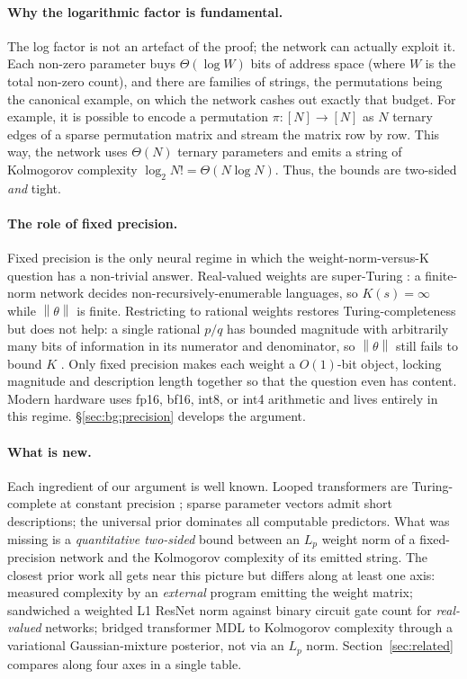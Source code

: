 \documentclass{article}
\theoremstyle{definition}
\newcommand{\norm}[1]{\left\lVert#1\right\rVert}
\begin{document}
\paragraph{Why the logarithmic factor is fundamental.} The log factor is not an artefact of the proof; the network can actually
exploit it. Each non-zero parameter buys $\Theta(\log W)$ bits of address space
(where $W$ is the total non-zero count), and there are families of strings, the
permutations being the canonical example, on which the network cashes out
exactly that budget. For example, it is possible to encode a permutation $\pi :
  [N] \to [N]$ as $N$ ternary edges of a sparse permutation matrix and stream the
matrix row by row. This way, the network uses $\Theta(N)$ ternary parameters
and emits a string of Kolmogorov complexity $\log_2 N! = \Theta(N \log N)$.
Thus, the bounds are two-sided \emph{and} tight.

\paragraph{The role of fixed precision.} Fixed precision is the only neural regime in which the weight-norm-versus-K
question has a non-trivial answer. Real-valued weights are super-Turing
\citep{siegelmann1995computational}: a finite-norm network decides
non-recursively-enumerable languages, so $K(s) = \infty$ while $\norm{\theta}$
is finite. Restricting to rational weights restores Turing-completeness but
does not help: a single rational $p/q$ has bounded magnitude with arbitrarily
many bits of information in its numerator and denominator, so $\norm{\theta}$
still fails to bound $K$ \citep{balcazar1997computational}. Only fixed
precision makes each weight a $O(1)$-bit object, locking magnitude and
description length together so that the question even has content. Modern
hardware uses fp16, bf16, int8, or int4 arithmetic and lives entirely in this
regime. \S\ref{sec:bg:precision} develops the argument.

\paragraph{What is new.} Each ingredient of our argument is well known. Looped transformers are
Turing-complete at constant precision
\citep{li2025constant,li2026efficient,giannou2023looped,perez2021attention,bhattamishra2020computational};
sparse parameter vectors admit short descriptions; the universal prior
dominates all computable predictors. What was missing is a \emph{quantitative
  two-sided} bound between an $L_p$ weight norm of a fixed-precision network and
the Kolmogorov complexity of its emitted string. The closest prior work all
gets near this picture but differs along at least one axis:
\citet{schmidhuber1997discovering} measured complexity by an \emph{external}
program emitting the weight matrix; \citet{jacot2025deep} sandwiched a weighted
L1 ResNet norm against binary circuit gate count for \emph{real-valued}
networks; \citet{shaw2026bridging} bridged transformer MDL to Kolmogorov
complexity through a variational Gaussian-mixture posterior, not via an $L_p$
norm. Section~\ref{sec:related} compares along four axes in a single table.
\end{document}

